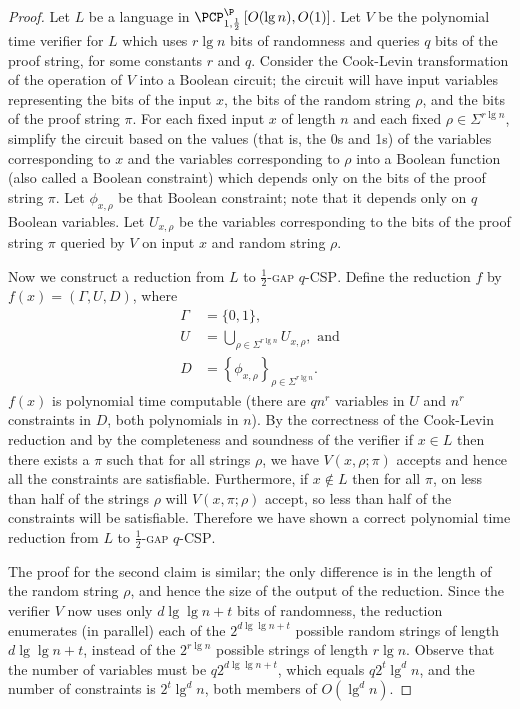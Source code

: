 \documentclass[]{article}
\newcommand{\PCPcs}[5]{\PCP^{#1}_{#2, #3}\left[#4, #5\right]}
\begin{document}
\begin{proof}
  Let $L$ be a language in $\PCPcs{\P}{1}{\frac{1}{2}}{O(\lg n)}{O(1)}$.
  Let $V$ be the polynomial time \PCP{} verifier for $L$ which uses $r \lg n$ bits of randomness and queries $q$ bits of the proof string, for some constants $r$ and $q$.
  Consider the Cook-Levin transformation of the operation of $V$ into a Boolean circuit; the circuit will have input variables representing the bits of the input $x$, the bits of the random string $\rho$, and the bits of the proof string $\pi$.
  For each fixed input $x$ of length $n$ and each fixed $\rho \in \Sigma^{r \lg n}$, simplify the circuit based on the values (that is, the 0s and 1s) of the variables corresponding to $x$ and the variables corresponding to $\rho$ into a Boolean function (also called a Boolean constraint) which depends only on the bits of the proof string $\pi$.
  Let $\phi_{x, \rho}$ be that Boolean constraint; note that it depends only on $q$ Boolean variables.
  Let $U_{x, \rho}$ be the variables corresponding to the bits of the proof string $\pi$ queried by $V$ on input $x$ and random string $\rho$.

  Now we construct a reduction from $L$ to \textsc{$\frac{1}{2}$-gap $q$-CSP}.
  Define the reduction $f$ by $f(x) = (\Gamma, U, D)$, where
  \begin{align*}
    \Gamma & = \{0, 1\}, \\
    U & = \bigcup_{\rho \in \Sigma^{r \lg n}}{U_{x, \rho}}, \text{ and} \\
    D & = \left\{\phi_{x, \rho}\right\}_{\rho \in \Sigma^{r \lg n}}.
  \end{align*}
  $f(x)$ is polynomial time computable (there are $qn^r$ variables in $U$ and $n^r$ constraints in $D$, both polynomials in $n$).
  By the correctness of the Cook-Levin reduction and by the completeness and soundness of the \PCP{} verifier if $x \in L$ then there exists a $\pi$ such that for all strings $\rho$, we have $V(x, \rho; \pi)$ accepts and hence all the constraints are satisfiable.
  Furthermore, if $x \notin L$ then for all $\pi$, on less than half of the strings $\rho$ will $V(x, \pi; \rho)$ accept, so less than half of the constraints will be satisfiable.
  Therefore we have shown a correct polynomial time reduction from $L$ to \textsc{$\frac{1}{2}$-gap $q$-CSP}.

  The proof for the second claim is similar; the only difference is in the length of the random string $\rho$, and hence the size of the output of the reduction.
  Since the verifier $V$ now uses only $d \lg \lg n + t$ bits of randomness, the reduction enumerates (in parallel) each of the $2^{d \lg \lg n + t}$ possible random strings of length $d \lg \lg n + t$, instead of the $2^{r \lg n}$ possible strings of length $r \lg n$.
  Observe that the number of variables must be $q 2^{d \lg \lg n + t}$, which equals $q 2^t \lg^d n$, and the number of constraints is $2^t \lg^d n$, both members of $O(\lg^d n)$.
\end{proof}
\end{document}
